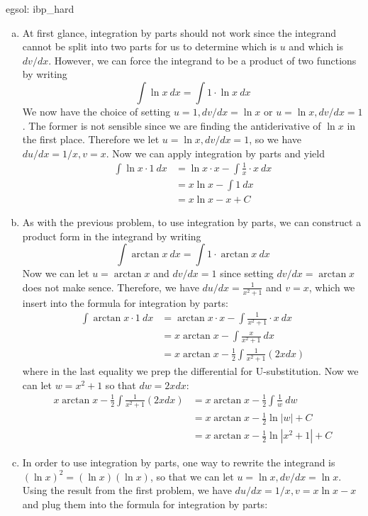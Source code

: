 \begin{egsol}[]{egsol: ibp_hard}
    \begin{enumerate}[a)]
        \item At first glance, integration by parts should not work since the integrand cannot be split into two parts for us to determine which is $u$ and which is $dv/dx$.  However, we can force the integrand to be a product of two functions by writing
        \[\int \ln x~dx = \int 1 \cdot \ln x~dx\]
        We now have the choice of setting $u = 1, dv/dx = \ln x$ or $u = \ln x, dv/dx = 1$.  The former is not sensible since we are finding the antiderivative of $\ln x$ in the first place.  Therefore we let $u = \ln x, dv/dx = 1$, so we have $du/dx = 1/x, v = x$.  Now we can apply integration by parts and yield
        \begin{align*}
            \int \ln x \cdot 1~dx &= \ln x \cdot x - \int \frac{1}{x} \cdot x~dx\\
            &= x\ln x - \int 1~dx\\
            &= x\ln x - x + C
        \end{align*}
        \item As with the previous problem, to use integration by parts, we can construct a product form in the integrand by writing
        \[\int \arctan x~dx = \int 1 \cdot \arctan x~dx\]
        Now we can let $u = \arctan x$ and $dv/dx = 1$ since setting $dv/dx = \arctan x$ does not make sence.  Therefore, we have $du/dx = \frac{1}{x^2+1}$ and $v = x$, which we insert into the formula for integration by parts:
        \begin{align*}
            \int \arctan x \cdot 1~dx &= \arctan x \cdot x - \int \frac{1}{x^2+1} \cdot x~dx\\
            &= x\arctan x - \int \frac{x}{x^2+1}~dx\\
            &= x\arctan x - \frac{1}{2}\int \frac{1}{x^2+1} (2x dx)
        \end{align*}
        where in the last equality we prep the differential for U-substitution.  Now we can let $w = x^2 + 1$ so that $dw = 2xdx$:
        \begin{align*}
            x\arctan x - \frac{1}{2}\int \frac{1}{x^2+1} (2x dx) &= x\arctan x - \frac{1}{2}\int \frac{1}{w}~dw \\
            &= x\arctan x - \frac{1}{2}\ln |w| + C\\
            &= x\arctan x - \frac{1}{2}\ln |x^2+1| + C
        \end{align*}
        \item In order to use integration by parts, one way to rewrite the integrand is $(\ln x)^2 = (\ln x)(\ln x)$, so that we can let $u = \ln x, dv/dx = \ln x$.  Using the result from the first problem,  we have $du/dx = 1/x, v = x\ln x - x$ and plug them into the formula for integration by parts:

\end{enumerate}
\end{egsol}
